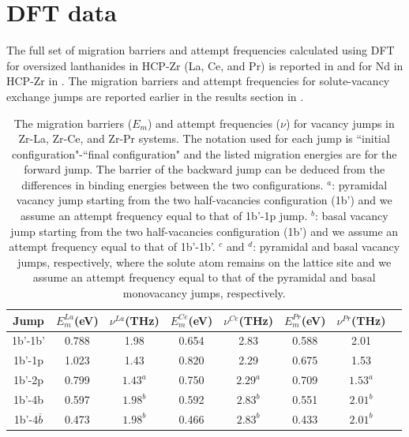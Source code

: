 \documentclass[preprint,12pt]{elsarticle}
\begin{document}
\FloatBarrier
\section{DFT data}
\label{app:dft_data}

\setcounter{figure}{0}
\setcounter{table}{0}

The full set of migration barriers and attempt frequencies calculated using DFT for oversized lanthanides in HCP-Zr (La, Ce, and Pr) is reported in  and for Nd in HCP-Zr in .  The migration barriers and attempt frequencies for solute-vacancy exchange jumps are reported earlier in the results section in . 





\begin{table}[h!]
    \centering
    \caption{The migration barriers ($E_m$) and attempt frequencies ($\nu$) for vacancy jumps in Zr-La, Zr-Ce, and Zr-Pr systems. The notation used for each jump is ``initial configuration"-``final configuration" and the listed migration energies are for the forward jump. The barrier of the backward jump can be deduced from the differences in binding energies between the two configurations.
    $^a$: pyramidal vacancy jump starting from the two half-vacancies configuration (1b') and we assume an attempt frequency equal to that of 1b'-1p jump. $^b$: basal vacancy jump starting from the two half-vacancies configuration (1b') and we assume an attempt frequency equal to that of 1b'-1b'. $^c$ and $^d$: pyramidal and basal vacancy jumps, respectively, where the solute atom remains on the lattice site and we assume an attempt frequency equal to that of the pyramidal and basal monovacancy jumps, respectively. }
    \begin{tabular}{c|c|c|c|c|c|c|c}
    \toprule
       Jump &$E_{m}^{La}$(eV) &$\nu^{La}$(THz) &$E_{m}^{Ce}$(eV) &$\nu^{Ce}$(THz)&$E_{m}^{Pr}$(eV) &$\nu^{Pr}$(THz)  \\
       \hline
       1b'-1b'  &0.788  &1.98 &0.654 &2.83 &0.588 &2.01 \\
       1b'-1p  &1.023  &1.43 &0.820 &2.29 &0.675 &1.53 \\
       1b'-2p  &0.799  &$1.43^{a}$ &0.750 &$2.29^{a}$ &0.709 &$1.53^{a}$ \\
       1b'-4b  &0.597  &$1.98^b$ &0.592 &$2.83^b$ &0.551 &$2.01^b$ \\
       1b'-4$\overline{b}$  &0.473  &$1.98^b$ &0.466 &$2.83^b$ &0.433 &$2.01^b$ \\

\end{tabular}
\end{table}
\end{document}
